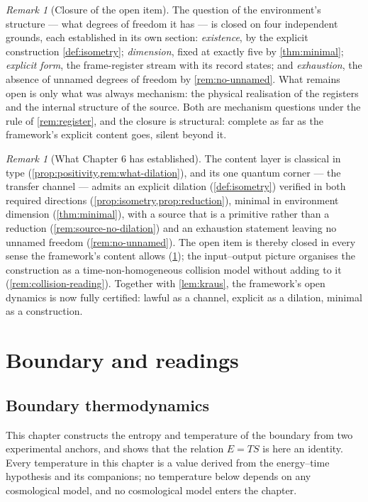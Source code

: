 \documentclass[11pt]{amsbook}
\theoremstyle{plain}
\theoremstyle{definition}
\theoremstyle{remark}
\newtheorem{remark}[theorem]{Remark}
\begin{document}
\begin{remark}[Closure of the open item]\label{rem:closure}
The question of the environment's structure --- what degrees of freedom it has --- is closed on four independent grounds, each established in its own section: \emph{existence}, by the explicit construction \cref{def:isometry}; \emph{dimension}, fixed at exactly five by \cref{thm:minimal}; \emph{explicit form}, the frame-register stream with its record states; and \emph{exhaustion}, the absence of unnamed degrees of freedom by \cref{rem:no-unnamed}. What remains open is only what was always mechanism: the physical realisation of the registers and the internal structure of the source. Both are mechanism questions under the rule of \cref{rem:register}, and the closure is structural: complete as far as the framework's explicit content goes, silent beyond it.
\end{remark}

\begin{remark}[What Chapter 6 has established]\label{rem:ch6summary}
The content layer is classical in type (\cref{prop:positivity,rem:what-dilation}), and its one quantum corner --- the transfer channel --- admits an explicit dilation (\cref{def:isometry}) verified in both required directions (\cref{prop:isometry,prop:reduction}), minimal in environment dimension (\cref{thm:minimal}), with a source that is a primitive rather than a reduction (\cref{rem:source-no-dilation}) and an exhaustion statement leaving no unnamed freedom (\cref{rem:no-unnamed}). The open item is thereby closed in every sense the framework's content allows (\cref{rem:closure}); the input--output picture organises the construction as a time-non-homogeneous collision model without adding to it (\cref{rem:collision-reading}). Together with \cref{lem:kraus}, the framework's open dynamics is now fully certified: lawful as a channel, explicit as a dilation, minimal as a construction.
\end{remark}

\part{Boundary and readings}

\chapter{Boundary thermodynamics}\label{ch:boundary}

This chapter constructs the entropy and temperature of the boundary from two experimental anchors, and shows that the relation $E = TS$ is here an identity. Every temperature in this chapter is a value derived from the energy--time hypothesis and its companions; no temperature below depends on any cosmological model, and no cosmological model enters the chapter.
\end{document}
